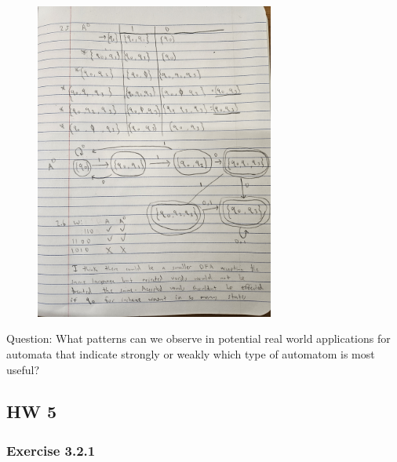 \documentclass{article}
\theoremstyle{theorem}
\theoremstyle{definition}
\theoremstyle{remark}
\begin{document}
\begin{figure}[H]
    \centering
    \includegraphics[angle=-90, width=0.7\textwidth]{latexImages/hw4-2.4.jpg} 
\end{figure}

Question: What patterns can we observe in potential real world applications for automata that indicate strongly or weakly which type of automatom is most useful?

\subsection{HW 5}

\subsubsection{Exercise 3.2.1}
\end{document}

